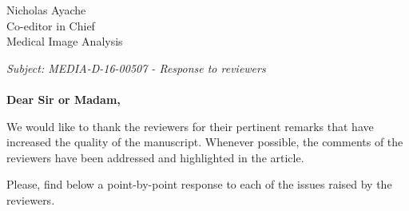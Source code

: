 \documentclass{letter}
\begin{document}

\begin{letter}{Nicholas Ayache \\ Co-editor in Chief \\ Medical Image Analysis} %


  \opening{
    \textit{Subject: MEDIA-D-16-00507 - Response to reviewers}\\ \\
    \textbf{Dear Sir or Madam,}}

  We would like to thank the reviewers for their pertinent
  remarks that have increased the quality of the manuscript. Whenever
  possible, the comments of the reviewers have been addressed and
  highlighted in the article.

  Please, find below a point-by-point response to each of the issues raised
  by the reviewers.


\end{letter}
\end{document}
